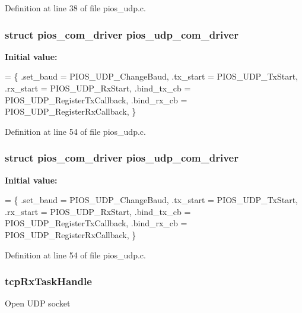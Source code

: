 Definition at line 38 of file pios\-\_\-udp.\-c.

\hypertarget{group___p_i_o_s___u_d_p_ga58da5534fd5007351a8ed77275aa8ad2}{
\subsubsection[{pios\-\_\-udp\-\_\-com\-\_\-driver}]{\setlength{\rightskip}{0pt plus 5cm}struct {\bf pios\-\_\-com\-\_\-driver} pios\-\_\-udp\-\_\-com\-\_\-driver}}\label{group___p_i_o_s___u_d_p_ga58da5534fd5007351a8ed77275aa8ad2}
{\bfseries Initial value\-:}
\begin{DoxyCode}
= \{
        .set\_baud   = PIOS\_UDP\_ChangeBaud,
        .tx\_start   = PIOS\_UDP\_TxStart,
        .rx\_start   = PIOS\_UDP\_RxStart,
        .bind\_tx\_cb = PIOS\_UDP\_RegisterTxCallback,
        .bind\_rx\_cb = PIOS\_UDP\_RegisterRxCallback,
\}
\end{DoxyCode}


Definition at line 54 of file pios\-\_\-udp.\-c.

\hypertarget{group___p_i_o_s___u_d_p_ga58da5534fd5007351a8ed77275aa8ad2}{
\subsubsection[{pios\-\_\-udp\-\_\-com\-\_\-driver}]{\setlength{\rightskip}{0pt plus 5cm}struct {\bf pios\-\_\-com\-\_\-driver} pios\-\_\-udp\-\_\-com\-\_\-driver}}\label{group___p_i_o_s___u_d_p_ga58da5534fd5007351a8ed77275aa8ad2}
{\bfseries Initial value\-:}
\begin{DoxyCode}
= \{
        .set\_baud   = PIOS\_UDP\_ChangeBaud,
        .tx\_start   = PIOS\_UDP\_TxStart,
        .rx\_start   = PIOS\_UDP\_RxStart,
        .bind\_tx\_cb = PIOS\_UDP\_RegisterTxCallback,
        .bind\_rx\_cb = PIOS\_UDP\_RegisterRxCallback,
\}
\end{DoxyCode}


Definition at line 54 of file pios\-\_\-udp.\-c.

\hypertarget{group___p_i_o_s___u_d_p_ga0ba5f55b2aa18edf726675729e68624e}{
\subsubsection[{tcp\-Rx\-Task\-Handle}]{ tcp\-Rx\-Task\-Handle}}\label{group___p_i_o_s___u_d_p_ga0ba5f55b2aa18edf726675729e68624e}
Open U\-D\-P socket 

